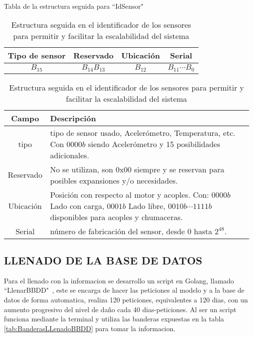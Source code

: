     \begin{table}[ht]
        \begin{center}
            Tabla de la estructura seguida para ``IdSensor"\  \\

            \vspace{0.3cm}
            \begin{tabular}{|c|c|c|c|}
                \hline
                Tipo de sensor & Reservado& Ubicación   & Serial \\\hline
                $ B_{15} $ & $ B_{14}B_{13} $ &$ B_{12} $  &  $ B_{11}\cdots B_{0} $\\
                \hline
            \end{tabular}

            \vspace{0.3cm}
            \begin{tabular}{|c|p{13cm}|}
                \hline
                Campo       & Descripción
                \\\hline\hline
                tipo        & tipo de sensor usado, Acelerómetro, Temperatura, etc.
                Con $0000b$ siendo Acelerómetro y 15 posibilidades adicionales.
                \\\hline
                Reservado   & No se utilizan, son 0x00 siempre y se reservan para
                posibles expansiones y/o necesidades.
                \\\hline
                Ubicación   & Posición con respecto al motor y acoples. Con:
                $0000b$ Lado con carga, $ 0001b$ Lado libre, $ 0010b\cdots1111b $
                disponibles para acoples y chumaceras.
                \\\hline
                Serial      & número de fabricación del sensor, desde 0 hasta $2^{48}$.
                \\\hline
            \end{tabular}
        \end{center}
        \caption[Estructura IdSensor]{Estructura seguida en el identificador de
        los sensores para permitir y facilitar la escalabilidad del sistema}
        \label{tab:CodIdSensor}
    \end{table}


\subsection{LLENADO DE LA BASE DE DATOS}
    Para el llenado con la informacion se desarrollo un script en Golang,
    llamado ``LlenarBBDD"\ , este
    se encarga de hacer las peticiones al modelo y a la base de datos de forma
    automatica, realiza 120 peticiones, equivalentes a 120 dias, con un aumento
    progresivo del nivel de daño cada 40 dias-peticiones. Al ser un script funciona
    mediante la terminal y utiliza las banderas expuestas en la tabla
    \ref{tab:BanderasLLenadoBBDD} para tomar la informacion.

